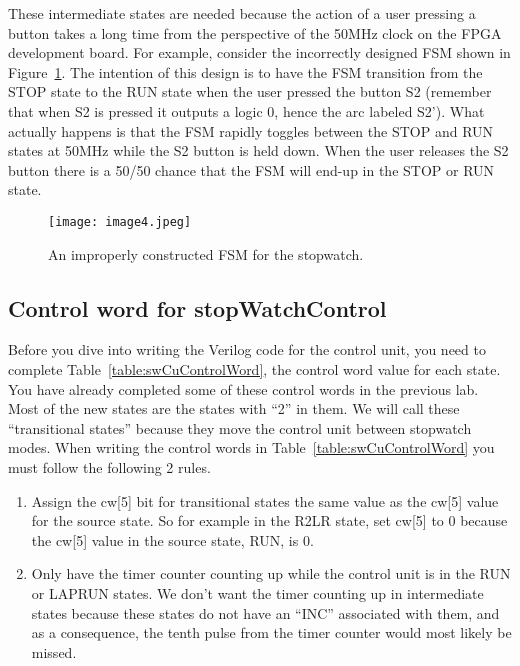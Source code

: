 These intermediate states are needed because the action of a user
pressing a button takes a long time from the perspective of the 50MHz
clock on the FPGA development board. For example, consider the incorrectly designed FSM
shown in Figure~\ref{fig:swCuImproperFsm}. The intention of this design is to have the FSM
transition from the STOP state to the RUN state when the user pressed
the button S2 (remember that when S2 is pressed it outputs a logic 0,
hence the arc labeled S2'). What actually happens is that the FSM
rapidly toggles between the STOP and RUN states at 50MHz while the S2
button is held down. When the user releases the S2 button there is a
50/50 chance that the FSM will end-up in the STOP or RUN state.

\begin{figure}[ht]
\texttt{[image: image4.jpeg]}
\caption{An improperly constructed FSM for the stopwatch.}
\label{fig:swCuImproperFsm}
\end{figure}

\subsection{Control word for stopWatchControl}
Before you dive into writing the Verilog code for the control unit, you
need to complete Table~\ref{table:swCuControlWord}, the control word value for each state. You
have already completed some of these control words in the previous lab.
Most of the new states are the states with ``2'' in them. We will call
these ``transitional states'' because they move the control unit between
stopwatch modes. When writing the control words in Table~\ref{table:swCuControlWord} you must
follow the following 2 rules.

\begin{enumerate}
\def\labelenumi{\arabic{enumi})}
\item
  Assign the cw{[}5{]} bit for transitional states the same value as the
  cw{[}5{]} value for the source state. So for example in the R2LR
  state, set cw{[}5{]} to 0 because the cw{[}5{]} value in the source
  state, RUN, is 0.
\item
  Only have the timer counter counting up while the control unit is in
  the RUN or LAPRUN states. We don't want the timer counting up in
  intermediate states because these states do not have an ``INC''
  associated with them, and as a consequence, the tenth pulse from the
  timer counter would most likely be missed.
\end{enumerate}

